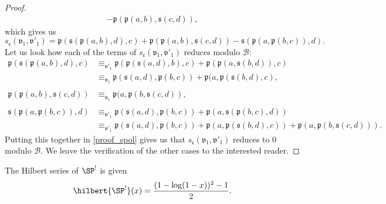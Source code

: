 \begin{proof}
\begin{equation}
\begin{split}
    -\mathfrak{p}(\mathfrak{p}(a,b),\mathfrak{s}(c,d)),
\end{split}\end{equation}
which gives us
\begin{equation}\label{proof_spol}
    s_{\mathfrak{c}}(\mathfrak{v}_1,\mathfrak{v'}_1) =  \mathfrak{p}(\mathfrak{s}(\mathfrak{p}(a,b),d),c) + \mathfrak{p}(\mathfrak{p}(a,b),\mathfrak{s}(c,d))
    -\mathfrak{s}(\mathfrak{p}(a,\mathfrak{p}(b,c)),d).
\end{equation}
Let us look how each of the terms of $s_{\mathfrak{c}}(\mathfrak{v}_1,\mathfrak{v'}_1)$ reduces 
modulo $\mathcal{B}$:
\begin{equation}\begin{split}
    \mathfrak{p}(\mathfrak{s}(\mathfrak{p}(a,b),d),c)
    &\equiv_{\mathfrak{v'}_1} \mathfrak{p}(\mathfrak{p}(\mathfrak{s}(a,d),b),c) + \mathfrak{p}(\mathfrak{p}(a,\mathfrak{s}(b,d)),c) \\
    &\equiv_{\mathfrak{v}_1} \mathfrak{p}(\mathfrak{s}(a,d),\mathfrak{p}(b,c)) + \mathfrak{p}(a, \mathfrak{p}(\mathfrak{s}(b,d),c), \\
    & \\
    \mathfrak{p}(\mathfrak{p}(a,b),\mathfrak{s}(c,d)) &\equiv_{\mathfrak{v}_1} \mathfrak{p}(a, \mathfrak{p}(b,\mathfrak{s}(c,d)), \\
    & \\
    \mathfrak{s}(\mathfrak{p}(a,\mathfrak{p}(b,c)),d) &\equiv_{\mathfrak{v'}_1} \mathfrak{p}(\mathfrak{s}(a,d),\mathfrak{p}(b,c)) +
    \mathfrak{p}(a,\mathfrak{s}(\mathfrak{p}(b,c),d))\\
    &\equiv_{\mathfrak{v'}_1} \mathfrak{p}(\mathfrak{s}(a,d),\mathfrak{p}(b,c)) + \mathfrak{p}(a,\mathfrak{p}(\mathfrak{s}(b,d),c)) +
    \mathfrak{p}(a,\mathfrak{p}(b,\mathfrak{s}(c,d))).
\end{split}\end{equation}
Putting this together in \eqref{proof_spol} gives us that $s_{\mathfrak{c}}(\mathfrak{v}_1,\mathfrak{v'}_1)$ 
reduces to $0$ modulo $\mathcal{B}$. We leave the verification of the other cases to the interested reader.
\end{proof}

\begin{prop} \label{prop_sp_hilbert}
    The Hilbert series of $\SP^{!}$ is given
    \begin{equation}
        \hilbert{\SP^!}(x) = \dfrac{(1-\log(1-x))^2-1}{2}.
    \end{equation}
\end{prop}

